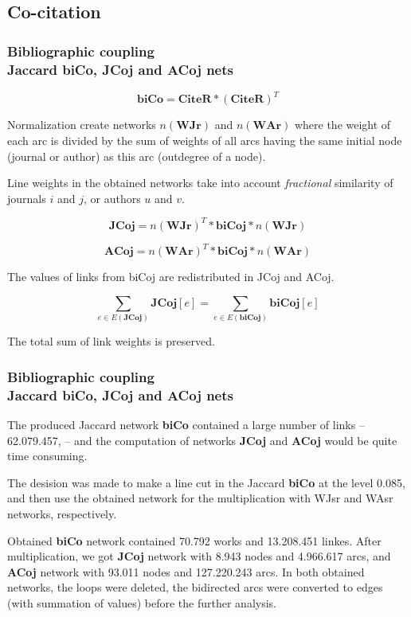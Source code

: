 \documentclass[hyperref={pdfstartview={FitBH -32768},
                         pdfpagemode=FullScreen,
                         plainpages=false,
                         colorlinks=true}
              ]{beamer}
\begin{document}
\subsection{Co-citation}  

\begin{frame}[fragile]
\frametitle{Bibliographic coupling \\ \normalsize Jaccard biCo, JCoj and ACoj nets}

\footnotesize
\[ \mathbf{biCo} = \mathbf{CiteR} * (\mathbf{CiteR}) ^ T \]  

Normalization create networks $n(\mathbf{WJr})$ and $n(\mathbf{WAr})$ where the weight of each arc is divided by the sum of weights of all arcs having the same initial node (journal or author) as this arc (outdegree of a node).

 Line weights in the obtained networks take into account \textit{fractional} similarity of journals $i$ and $j$, or authors $u$ and $v$. 

\[ \mathbf{JCoj} = n(\mathbf{WJr}) ^ T * \mathbf{biCoj} * n(\mathbf{WJr}) \]  

\[ \mathbf{ACoj} = n(\mathbf{WAr}) ^ T * \mathbf{biCoj} * n(\mathbf{WAr}) \]  

The values of links from biCoj are redistributed in JCoj and ACoj. 

	\[ \sum_{e \in E(\mathbf{JCoj})} \mathbf{JCoj}[e] = \sum_{e \in E(\mathbf{biCoj})} \mathbf{biCoj}[e] \] 

The total sum of link weights is preserved.

\end{frame}

\begin{frame}[fragile]
\frametitle{Bibliographic coupling \\ \normalsize Jaccard biCo, JCoj and ACoj nets}
\footnotesize
The produced Jaccard network \textbf{biCo} contained a large number of links -- 62.079.457, -- and the computation of networks \textbf{JCoj} and \textbf{ACoj} would be quite time consuming. \medskip 

The desision was made to make a line cut in the Jaccard \textbf{biCo} at the level 0.085, and then use the obtained network for the multiplication with WJsr and WAsr networks, respectively.  \medskip 

Obtained \textbf{biCo} network contained 70.792 works and 13.208.451 linkes. After multiplication, we got \textbf{JCoj} network with 8.943 nodes and 4.966.617 arcs, and \textbf{ACoj} network with 93.011 nodes and 127.220.243 arcs. In both obtained networks, the loops were deleted, the bidirected arcs were converted to edges (with summation of values) before the further analysis. \medskip 

\end{frame}
\end{document}

